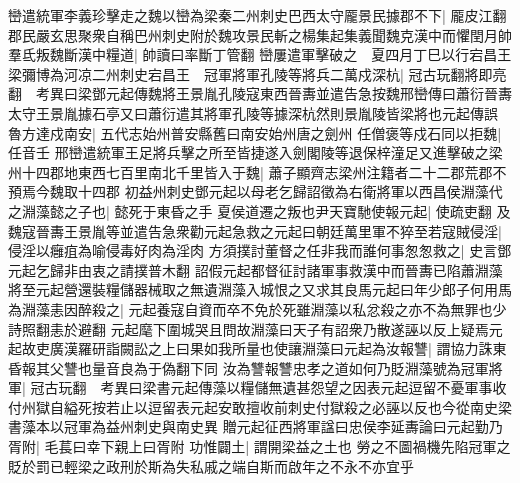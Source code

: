巒遣統軍李義珍擊走之魏以巒為梁秦二州刺史巴西太守龎景民據郡不下|{
	龎皮江翻}
郡民嚴玄思聚衆自稱巴州刺史附於魏攻景民斬之楊集起集義聞魏克漢中而懼閏月帥羣氐叛魏斷漢中糧道|{
	帥讀曰率斷丁管翻}
巒屢遣軍擊破之　夏四月丁巳以行宕昌王梁彌博為河凉二州刺史宕昌王　冠軍將軍孔陵等將兵二萬戍深杭|{
	冠古玩翻將即亮翻　考異曰梁鄧元起傳魏將王景胤孔陵寇東西晉夀並遣告急按魏邢巒傳曰蕭衍晉夀太守王景胤據石亭又曰蕭衍遣其將軍孔陵等據深杭然則景胤陵皆梁將也元起傳誤}
魯方達戍南安|{
	五代志始州普安縣舊曰南安始州唐之劍州}
任僧褒等戍石同以拒魏|{
	任音壬}
邢巒遣統軍王足將兵擊之所至皆捷遂入劍閣陵等退保梓潼足又進擊破之梁州十四郡地東西七百里南北千里皆入于魏|{
	蕭子顯齊志梁州注籍者二十二郡荒郡不預焉今魏取十四郡}
初益州刺史鄧元起以母老乞歸詔徵為右衛將軍以西昌侯淵藻代之淵藻懿之子也|{
	懿死于東昏之手}
夏侯道遷之叛也尹天寶馳使報元起|{
	使疏吏翻}
及魏寇晉夀王景胤等並遣告急衆勸元起急救之元起曰朝廷萬里軍不猝至若寇賊侵淫|{
	侵淫以癰疽為喻侵毒好肉為淫肉}
方須撲討董督之任非我而誰何事怱怱救之|{
	史言鄧元起乞歸非由衷之請撲普木翻}
詔假元起都督征討諸軍事救漢中而晉夀已陷蕭淵藻將至元起營還裝糧儲器械取之無遺淵藻入城恨之又求其良馬元起曰年少郎子何用馬為淵藻恚因醉殺之|{
	元起養寇自資而卒不免於死雖淵藻以私忿殺之亦不為無罪也少詩照翻恚於避翻}
元起麾下圍城哭且問故淵藻曰天子有詔衆乃散遂誣以反上疑焉元起故吏廣漢羅研詣闕訟之上曰果如我所量也使讓淵藻曰元起為汝報讐|{
	謂協力誅東昏報其父讐也量音良為于偽翻下同}
汝為讐報讐忠孝之道如何乃貶淵藻號為冠軍將軍|{
	冠古玩翻　考異曰梁書元起傳藻以糧儲無遺甚怨望之因表元起逗留不憂軍事收付州獄自縊死按若止以逗留表元起安敢擅收前刺史付獄殺之必誣以反也今從南史梁書藻本以冠軍為益州刺史與南史異}
贈元起征西將軍諡曰忠侯李延夀論曰元起勤乃胥附|{
	毛萇曰幸下親上曰胥附}
功惟闢土|{
	謂開梁益之土也}
勞之不圖禍機先陷冠軍之貶於罰已輕梁之政刑於斯為失私戚之端自斯而啟年之不永不亦宜乎


